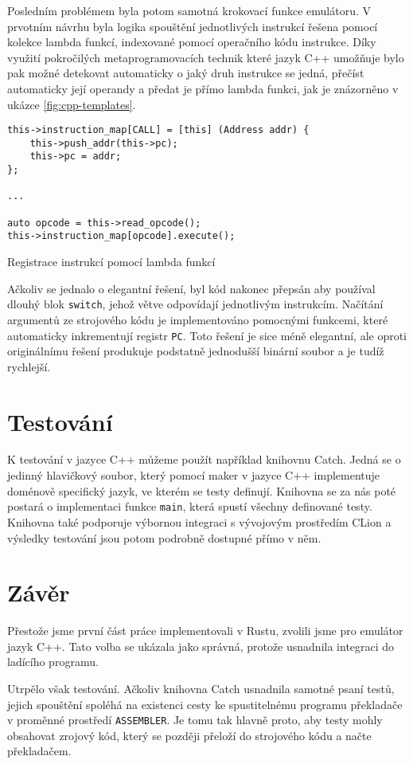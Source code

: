 Posledním problémem byla potom samotná krokovací funkce emulátoru. V prvotním návrhu byla logika spouštění jednotlivých instrukcí řešena pomocí kolekce lambda funkcí, indexované pomocí operačního kódu instrukce. Díky využití pokročilých metaprogramovacích technik které jazyk C++ umožňuje bylo pak možné detekovat automaticky o jaký druh instrukce se jedná, přečíst automaticky její operandy a předat je přímo lambda funkci, jak je znázorněno v ukázce \ref{fig:cpp-templates}.

\begin{listing}
\begin{verbatim}
this->instruction_map[CALL] = [this] (Address addr) {
	this->push_addr(this->pc);
	this->pc = addr;
};

...

auto opcode = this->read_opcode();
this->instruction_map[opcode].execute();
\end{verbatim}
\caption{Registrace instrukcí pomocí lambda funkcí}
\label{fig:cpp-templates}
\end{listing}

Ačkoliv se jednalo o elegantní řešení, byl kód nakonec přepsán aby používal dlouhý blok \texttt{switch}, jehož větve odpovídají jednotlivým instrukcím. Načítání argumentů ze strojového kódu je implementováno pomocnými funkcemi, které automaticky inkrementují registr \texttt{PC}. Toto řešení je sice méně elegantní, ale oproti originálnímu řešení produkuje podstatně jednodušší binární soubor a je tudíž rychlejší.

\section{Testování}
\label{sec:emu-test}

K testování v jazyce C++ můžeme použít například knihovnu Catch\cite{github-catch}. Jedná se o jedinný hlavičkový soubor, který pomocí maker v jazyce C++ implementuje doménově specifický jazyk, ve kterém se testy definují. Knihovna se za nás poté postará o implementaci funkce \texttt{main}, která spustí všechny definované testy. Knihovna také podporuje výbornou integraci s vývojovým prostředím CLion\cite{clion-catch} a výsledky testování jsou potom podrobně dostupné přímo v něm.

\section{Závěr}

Přestože jsme první část práce implementovali v Rustu, zvolili jsme pro emulátor jazyk C++. Tato volba se ukázala jako správná, protože usnadnila integraci do ladícího programu.

Utrpělo však testování. Ačkoliv knihovna Catch usnadnila samotné psaní testů, jejich spouštění spoléhá na existenci cesty ke spustitelnému programu překladače v proměnné prostředí \texttt{ASSEMBLER}. Je tomu tak hlavně proto, aby testy mohly obsahovat zrojový kód, který se později přeloží do strojového kódu a načte překladačem.
